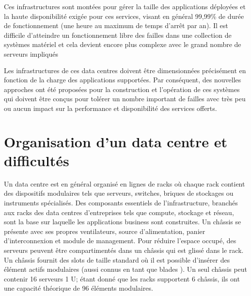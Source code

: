 Ces infrastructures sont montées pour gérer la taille des applications déployées et la haute disponibilité exigée pour ces services, visant en général 99,99\% de durée de fonctionnement (une heure au maximum de temps d'arrêt par an). Il est difficile d'atteindre un fonctionnement libre des failles dans une collection de systèmes matériel et cela devient encore plus complexe avec le grand nombre de serveurs impliqués

\par
Les infrastructures de ces data centres doivent être dimensionnées précisément  en fonction de la charge des applications supportées. Par conséquent, des nouvelles approches ont été proposées pour la construction et l'opération de ces systèmes qui doivent être conçus pour tolérer un nombre important de failles avec très peu ou aucun impact sur la performance et disponibilité des services offerts. \cite{understandingCloudWhatDC}  \cite{datacenterAsComputerIntro}

\section{Organisation d'un data centre et difficultés}

Un data centre est en général organisé en lignes de racks où chaque rack contient des dispositifs modulaires tels que serveurs, switches, briques de stockages ou instruments spécialisés. %
Des composants essentiels de l'infrastructure, branchés aux racks des data centres d'entreprises tels que compute, stockage et réseau, sont la base sur laquelle les applications business sont construites. Un châssis se présente avec ses propres ventilateurs, source d'alimentation, panier d'interconnexion et module de management. 
Pour réduire l'espace occupé, des serveurs peuvent être compartimentés dans un châssis qui est glissé dans le rack. Un châssis fournit des slots de taille standard où il est possible d'insérer des élément actifs modulaires (aussi connus en tant que \og blades \fg{}). Un seul châssis peut contenir 16 serveurs 1 U; étant donné que les racks supportent 6 châssis, ils ont une capacité théorique de 96 éléments modulaires.


